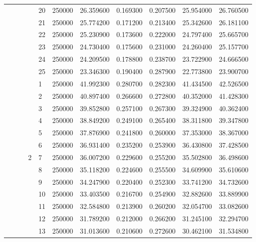 \begin{tabular}{llllllrrrrr}
\cline{5-11}
 &  &  &  & 20 & 250000 & 26.359600 & 0.169300 & 0.207500 & 25.954000 & 26.760500 \\
\cline{5-11}
 &  &  &  & 21 & 250000 & 25.774200 & 0.171200 & 0.213400 & 25.342600 & 26.181100 \\
\cline{5-11}
 &  &  &  & 22 & 250000 & 25.230900 & 0.173600 & 0.222000 & 24.797400 & 25.665700 \\
\cline{5-11}
 &  &  &  & 23 & 250000 & 24.730400 & 0.175600 & 0.231000 & 24.260400 & 25.157700 \\
\cline{5-11}
 &  &  &  & 24 & 250000 & 24.209500 & 0.178800 & 0.238700 & 23.722900 & 24.666500 \\
\cline{5-11}
 &  &  &  & 25 & 250000 & 23.346300 & 0.190400 & 0.287900 & 22.773800 & 23.900700 \\
\cline{4-11} \cline{5-11}
 &  &  & \multirow[t]{25}{*}{2} & 1 & 250000 & 41.992300 & 0.280700 & 0.282300 & 41.434500 & 42.526500 \\
\cline{5-11}
 &  &  &  & 2 & 250000 & 40.897400 & 0.266600 & 0.272800 & 40.352000 & 41.428300 \\
\cline{5-11}
 &  &  &  & 3 & 250000 & 39.852800 & 0.257100 & 0.267300 & 39.324900 & 40.362400 \\
\cline{5-11}
 &  &  &  & 4 & 250000 & 38.849200 & 0.249100 & 0.265400 & 38.311800 & 39.347800 \\
\cline{5-11}
 &  &  &  & 5 & 250000 & 37.876900 & 0.241800 & 0.260000 & 37.353000 & 38.367000 \\
\cline{5-11}
 &  &  &  & 6 & 250000 & 36.931400 & 0.235200 & 0.253900 & 36.430800 & 37.428500 \\
\cline{5-11}
 &  &  &  & 7 & 250000 & 36.007200 & 0.229600 & 0.255200 & 35.502800 & 36.498600 \\
\cline{5-11}
 &  &  &  & 8 & 250000 & 35.118200 & 0.224600 & 0.255500 & 34.609900 & 35.610600 \\
\cline{5-11}
 &  &  &  & 9 & 250000 & 34.247900 & 0.220400 & 0.252300 & 33.741200 & 34.732600 \\
\cline{5-11}
 &  &  &  & 10 & 250000 & 33.403500 & 0.216700 & 0.254900 & 32.882600 & 33.889900 \\
\cline{5-11}
 &  &  &  & 11 & 250000 & 32.584800 & 0.213900 & 0.260200 & 32.054700 & 33.082600 \\
\cline{5-11}
 &  &  &  & 12 & 250000 & 31.789200 & 0.212000 & 0.266200 & 31.245100 & 32.294700 \\
\cline{5-11}
 &  &  &  & 13 & 250000 & 31.013600 & 0.210600 & 0.272600 & 30.462100 & 31.534800 \\

\end{tabular}
